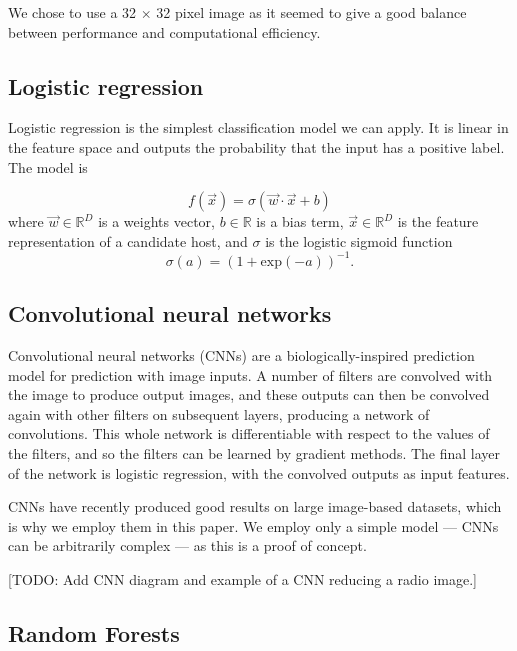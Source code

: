 \documentclass[fleqn,usenatbib,usedcolumn]{mnras}
\begin{document}
    We chose to use a 32 $\times$ 32 pixel image as it seemed to give a
    good balance between performance and computational efficiency.

  \subsection{Logistic regression}\label{logistic-regression}

    Logistic regression is the simplest classification model we can apply.
    It is linear in the feature space and outputs the probability that the
    input has a positive label. The model is

    \[
        f(\vec x) = \sigma(\vec w \cdot \vec x + b)
    \] where \(\vec w \in \mathbb{R}^D\) is a weights vector,
    \(b \in \mathbb{R}\) is a bias term, \(\vec x \in \mathbb{R}^D\) is the
    feature representation of a candidate host, and \(\sigma\) is the
    logistic sigmoid function \[
        \sigma(a) = (1 + \mathrm{exp}(-a))^{-1}.
    \]

  \subsection{Convolutional neural
  networks}\label{convolutional-neural-networks}

    Convolutional neural networks (CNNs) are a biologically-inspired
    prediction model for prediction with image inputs. A number of filters
    are convolved with the image to produce output images, and these outputs
    can then be convolved again with other filters on subsequent layers,
    producing a network of convolutions. This whole network is
    differentiable with respect to the values of the filters, and so the
    filters can be learned by gradient methods. The final layer of the
    network is logistic regression, with the convolved outputs as input
    features.

    CNNs have recently produced good results on large image-based datasets,
    which is why we employ them in this paper. We employ only a simple model
    --- CNNs can be arbitrarily complex --- as this is a proof of concept.

    {[}TODO: Add CNN diagram and example of a CNN reducing a radio image.{]}

  \subsection{Random Forests}\label{random-forests}
\end{document}
